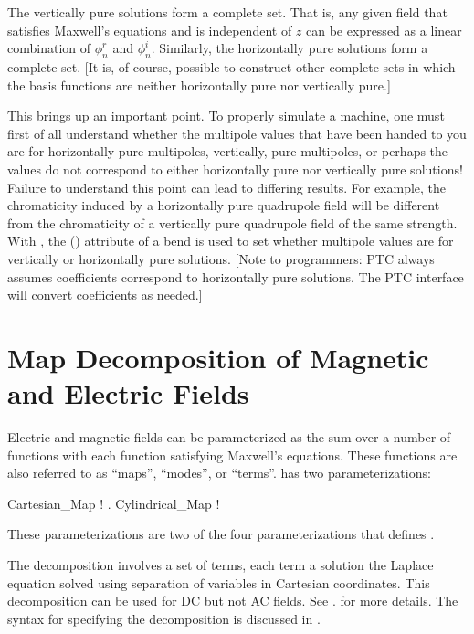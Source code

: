 The vertically pure solutions form a complete set. That is, any given field that satisfies
Maxwell's equations and is independent of $z$ can be expressed as a linear combination of
$\phi_n^r$ and $\phi_n^i$. Similarly, the horizontally pure solutions form a complete
set. [It is, of course, possible to construct other complete sets in which the basis
functions are neither horizontally pure nor vertically pure.]

This brings up an important point. To properly simulate a machine, one must first of all
understand whether the multipole values that have been handed to you are for horizontally
pure multipoles, vertically, pure multipoles, or perhaps the values do not correspond to
either horizontally pure nor vertically pure solutions! Failure to understand this point
can lead to differing results. For example, the chromaticity induced by a horizontally
pure quadrupole field will be different from the chromaticity of a vertically pure
quadrupole field of the same strength. With \bmad, the 
() attribute of a bend is used to set whether multipole values are for
vertically or horizontally pure solutions. [Note to programmers: PTC always assumes
coefficients correspond to horizontally pure solutions. The \bmad PTC interface will
convert coefficients as needed.]

\section{Map Decomposition of Magnetic and Electric Fields}
\label{s:field.map}

Electric and magnetic fields can be parameterized as the sum over a number of functions
with each function satisfying Maxwell's equations. These functions are also referred to as
``maps'', ``modes'', or ``terms''. \bmad has two parameterizations:
\begin{example}
  Cartesian_Map      ! .
  Cylindrical_Map    ! 
\end{example}
These parameterizations are two of the four  parameterizations that \bmad
defines .

The  decomposition involves a set of terms, each term a solution the
Laplace equation solved using separation of variables in Cartesian coordinates. This
decomposition can be used for DC but not AC fields. See .
for more details. The syntax for specifying the  decomposition
is discussed in .

